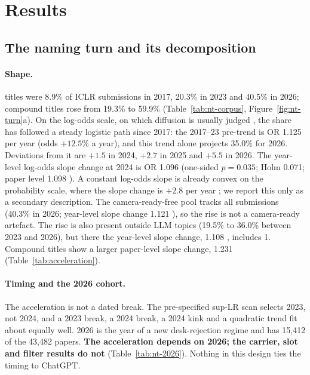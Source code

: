 \section{Results}
\label{sec:nt-results}

\subsection{The naming turn and its decomposition}
\label{sec:nt-turn}

\paragraph{Shape.}
\NAME{} titles were 8.9\% of ICLR submissions in 2017, 20.3\% in 2023 and 40.5\% in 2026; compound titles rose from 19.3\% to 59.9\% (Table~\ref{tab:nt-corpus}, Figure~\ref{fig:nt-turn}a). %
On the log-odds scale, on which diffusion is usually judged \citep{bass1969new}, the share has followed a steady logistic path since 2017: the 2017--23 pre-trend is OR 1.125 per year (odds $+12.5\%$ a year), and this trend alone projects 35.0\% for 2026. Deviations from it are $+1.5$\pp{}  in 2024, $+2.7$\pp{}  in 2025 and $+5.5$\pp{}  in 2026. The year-level log-odds slope change at 2024 is OR 1.096  (one-sided $p=0.035$; Holm 0.071; paper level 1.098 ). A constant log-odds slope is already convex on the probability scale, where the slope change is $+2.8$\pp{} per year ; we report this only as a secondary description. The camera-ready-free pool tracks all submissions (40.3\% in 2026; year-level slope change 1.121 ), so the rise is not a camera-ready artefact. The rise is also present outside LLM topics (19.5\% to 36.0\% between 2023 and 2026), but there the year-level slope change, 1.108 , includes 1. Compound titles show a larger paper-level slope change, 1.231  (Table~\ref{tab:acceleration}).

\paragraph{Timing and the 2026 cohort.}
The acceleration is not a dated break. The pre-specified sup-LR scan selects 2023, not 2024, and a 2023 break, a 2024 break, a 2024 kink and a quadratic trend fit about equally well. 2026 is the year of a new desk-rejection regime and has 15,412 of the 43,482 papers. \textbf{The acceleration depends on 2026; the carrier, slot and filter results do not} (Table~\ref{tab:nt-2026}). Nothing in this design ties the timing to ChatGPT.

